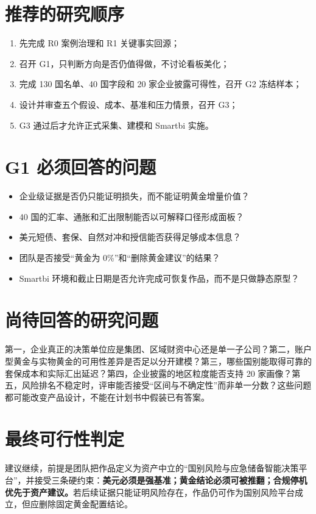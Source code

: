 \documentclass[UTF8,12pt,openany]{ctexbook}
\begin{document}
\section{推荐的研究顺序}
\begin{enumerate}
  \item 先完成 R0 案例治理和 R1 关键事实回源；
  \item 召开 G1，只判断方向是否仍值得做，不讨论看板美化；
  \item 完成 130 国名单、40 国字段和 20 家企业披露可得性，召开 G2 冻结样本；
  \item 设计并审查五个假设、成本、基准和压力情景，召开 G3；
  \item G3 通过后才允许正式采集、建模和 Smartbi 实施。
\end{enumerate}

\section{G1 必须回答的问题}
\begin{itemize}
  \item 企业级证据是否仍只能证明损失，而不能证明黄金增量价值？
  \item 40 国的汇率、通胀和汇出限制能否以可解释口径形成面板？
  \item 美元短债、套保、自然对冲和授信能否获得足够成本信息？
  \item 团队是否接受“黄金为 0\%”和“删除黄金建议”的结果？
  \item Smartbi 环境和截止日期是否允许完成可恢复作品，而不是只做静态原型？
\end{itemize}

\section{尚待回答的研究问题}
第一，企业真正的决策单位应是集团、区域财资中心还是单一子公司？第二，账户型黄金与实物黄金的可用性差异是否足以分开建模？第三，哪些国别能取得可靠的套保成本和实际汇出延迟？第四，企业披露的地区粒度能否支持 20 家画像？第五，风险排名不稳定时，评审能否接受“区间与不确定性”而非单一分数？这些问题都可能改变产品设计，不能在计划书中假装已有答案。

\section{最终可行性判定}
\begin{decisionbox}[本册结论]
建议继续，前提是团队把作品定义为资产中立的“国别风险与应急储备智能决策平台”，并接受三条硬约束：\textbf{美元必须是强基准；黄金结论必须可被推翻；合规停机优先于资产建议。}若后续证据只能证明风险存在，作品仍可作为国别风险平台成立，但应删除固定黄金配置结论。
\end{decisionbox}
\end{document}
